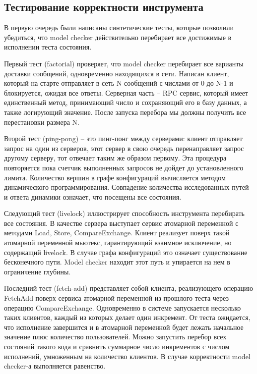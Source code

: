 \subsection{Тестирование корректности инструмента}

В первую очередь были написаны синтетические тесты, которые позволили убедиться, что model checker действительно перебирает все достижимые в исполнении теста состояния.

Первый тест (factorial) проверяет, что model checker перебирает все варианты доставки сообщений, одновременно находящихся в сети. Написан клиент, который на старте отправляет в сеть N сообщений с числами от 0 до N-1 и блокируется, ожидая все ответы. Серверная часть – RPC сервис, который имеет единственный метод, принимающий число и сохраняющий его в базу данных, а также логирующий значение. После запуска перебора мы должны получить все перестановки размера N.

Второй тест (ping-pong) – это пинг-понг между серверами: клиент отправляет запрос на один из серверов, этот сервер в свою очередь перенаправляет запрос другому серверу, тот отвечает таким же образом первому. Эта процедура повторяется пока счетчик выполненных запросов не дойдет до установленного лимита. Количество вершин в графе конфигураций вычисляется методом динамического программирования. Совпадение количества исследованных путей и ответа динамики означает, что посещены все состояния.

Следующий тест (livelock) иллюстрирует способность инструмента перебирать все состояния. В качестве сервера выступает сервис атомарной переменной с методами Load, Store, CompareExchange. Клиент реализует поверх такой атомарной переменной мьютекс, гарантирующий взаимное исключение,  но содержащий livelock. В случае графа конфигураций это означает существование бесконечного пути. Model checker находит этот путь и упирается на нем в ограничение глубины.

Последний тест (fetch-add) представляет собой клиента, реализующего операцию FetchAdd поверх сервиса атомарной переменной из прошлого теста через операцию CompareExchange. Одновременно в системе запускается несколько таких клиентов, каждый из которых делает один инкремент. От теста ожидается, что исполнение завершится и в атомарной переменной будет лежать начальное значение плюс количество пользователей. Можно запустить перебор всех состояний такого кода и сравнить суммарное число инкрементов с числом исполнений, умноженным на количество клиентов. В случае корректности model checker-а выполняется равенство.
